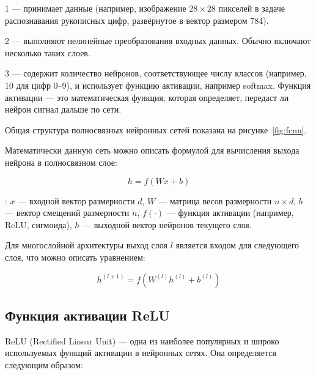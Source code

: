     1  — принимает данные (например, изображение 
    $28\times28$ пикселей в задаче распознавания рукописных цифр, развёрнутое в
    вектор размером 784).

    2  — выполняют нелинейные преобразования входных данных. 
    Обычно включают несколько таких слоев.

    3  — содержит количество нейронов, соответствующее 
    числу классов (например, 10 для цифр 0–9), и использует функцию активации, 
    например softmax. Функция активации — это математическая функция, которая 
    определяет, передаст ли нейрон сигнал дальше по сети.

Общая структура полносвязных нейронных сетей показана на 
рисунке~\ref{fig:fcnn}.

Математически данную сеть можно описать формулой для вычисления выхода нейрона 
в полносвязном слое:

\begin{equation}
    {h} = f({W} {x} + {b})
\end{equation}

: ${x}$ — входной вектор размерности $d$,
              ${W}$ — матрица весов размерности $n \times d$,
              ${b}$ — вектор смещений размерности $n$,
              $f(\cdot)$ — функция активации (например, ReLU, сигмоида),
              ${h}$ — выходной вектор нейронов текущего слоя.

Для многослойной архитектуры выход слоя $l$ является входом для следующего слоя, 
что можно описать уравнением:

\begin{equation}
    {h}^{(l+1)} = f({W}^{(l)} {h}^{(l)} + {b}^{(l)})
\end{equation}


\subsection{Функция активации ReLU}
\hspace*{12.5 mm}ReLU (Rectified Linear Unit) — одна из наиболее популярных и 
широко используемых функций активации в нейронных сетях. Она определяется 
следующим образом:

